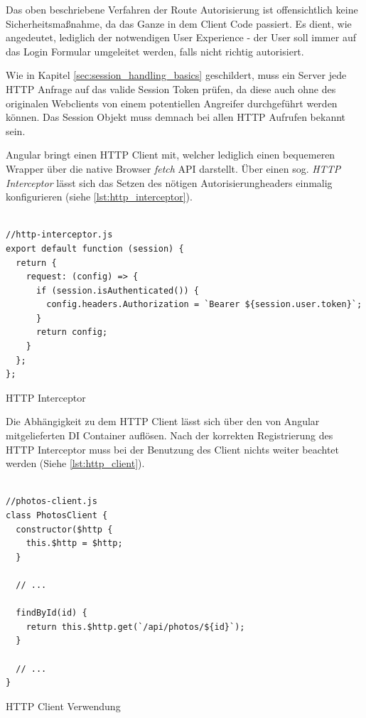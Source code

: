 Das oben beschriebene Verfahren der Route Autorisierung ist offensichtlich keine Sicherheitsmaßnahme, da das Ganze in dem Client Code passiert. Es dient, wie angedeutet, lediglich der notwendigen User Experience - der User soll immer auf das Login Formular umgeleitet werden, falls nicht richtig autorisiert. 

Wie in Kapitel \ref{sec:session_handling_basics} geschildert, muss ein Server jede HTTP Anfrage auf das valide Session Token prüfen, da diese auch ohne des originalen Webclients von einem potentiellen Angreifer durchgeführt werden können. Das Session Objekt muss demnach bei allen HTTP Aufrufen bekannt sein. 

Angular bringt einen HTTP Client mit, welcher lediglich einen bequemeren Wrapper über die native Browser \textit{fetch} API darstellt. Über einen sog. \textit{HTTP Interceptor} lässt sich das Setzen des nötigen Autorisierungheaders einmalig konfigurieren (siehe \ref{lst:http_interceptor}).

\begin{listing}[H]
\begin{verbatim}

//http-interceptor.js
export default function (session) {
  return {
    request: (config) => {
      if (session.isAuthenticated()) {
        config.headers.Authorization = `Bearer ${session.user.token}`;
      }
      return config;
    }
  };
};

\end{verbatim}
\caption{HTTP Interceptor}
\label{lst:http_interceptor}
\end{listing}

Die Abhängigkeit zu dem HTTP Client lässt sich über den von Angular mitgelieferten DI Container auflösen. Nach der korrekten Registrierung des HTTP Interceptor muss bei der Benutzung des Client nichts weiter beachtet werden (Siehe \ref{lst:http_client}).

\begin{listing}[H]
\begin{verbatim}

//photos-client.js
class PhotosClient {
  constructor($http {
    this.$http = $http;
  }

  // ...

  findById(id) {
    return this.$http.get(`/api/photos/${id}`);
  }

  // ...
}  

\end{verbatim}
\caption{HTTP Client Verwendung}
\label{lst:http_client}
\end{listing} 

